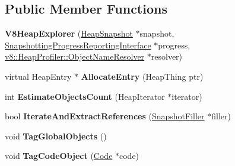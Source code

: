 \subsection*{Public Member Functions}
\begin{DoxyCompactItemize}
\item 
{\bfseries V8\+Heap\+Explorer} (\hyperlink{classv8_1_1internal_1_1_heap_snapshot}{Heap\+Snapshot} $\ast$snapshot, \hyperlink{classv8_1_1internal_1_1_snapshotting_progress_reporting_interface}{Snapshotting\+Progress\+Reporting\+Interface} $\ast$progress, \hyperlink{classv8_1_1_heap_profiler_1_1_object_name_resolver}{v8\+::\+Heap\+Profiler\+::\+Object\+Name\+Resolver} $\ast$resolver)\hypertarget{classv8_1_1internal_1_1_v8_heap_explorer_a380cad4a97cc6608f02640026ef32441}{}\label{classv8_1_1internal_1_1_v8_heap_explorer_a380cad4a97cc6608f02640026ef32441}

\item 
virtual Heap\+Entry $\ast$ {\bfseries Allocate\+Entry} (Heap\+Thing ptr)\hypertarget{classv8_1_1internal_1_1_v8_heap_explorer_a074fd0c7b6ef4e664a873d297850c80e}{}\label{classv8_1_1internal_1_1_v8_heap_explorer_a074fd0c7b6ef4e664a873d297850c80e}

\item 
int {\bfseries Estimate\+Objects\+Count} (Heap\+Iterator $\ast$iterator)\hypertarget{classv8_1_1internal_1_1_v8_heap_explorer_af4f43686b87f0135ba2db4a384c303f4}{}\label{classv8_1_1internal_1_1_v8_heap_explorer_af4f43686b87f0135ba2db4a384c303f4}

\item 
bool {\bfseries Iterate\+And\+Extract\+References} (\hyperlink{classv8_1_1internal_1_1_snapshot_filler}{Snapshot\+Filler} $\ast$filler)\hypertarget{classv8_1_1internal_1_1_v8_heap_explorer_a1cf4b763af4920c92a7195e5222a61c4}{}\label{classv8_1_1internal_1_1_v8_heap_explorer_a1cf4b763af4920c92a7195e5222a61c4}

\item 
void {\bfseries Tag\+Global\+Objects} ()\hypertarget{classv8_1_1internal_1_1_v8_heap_explorer_a3fc89ba6b31b1f48e4ce026976eeaf79}{}\label{classv8_1_1internal_1_1_v8_heap_explorer_a3fc89ba6b31b1f48e4ce026976eeaf79}

\item 
void {\bfseries Tag\+Code\+Object} (\hyperlink{classv8_1_1internal_1_1_code}{Code} $\ast$code)\hypertarget{classv8_1_1internal_1_1_v8_heap_explorer_a05f5e92ad08d54b75baaace7509ec2d4}{}\label{classv8_1_1internal_1_1_v8_heap_explorer_a05f5e92ad08d54b75baaace7509ec2d4}


\end{DoxyCompactItemize}
